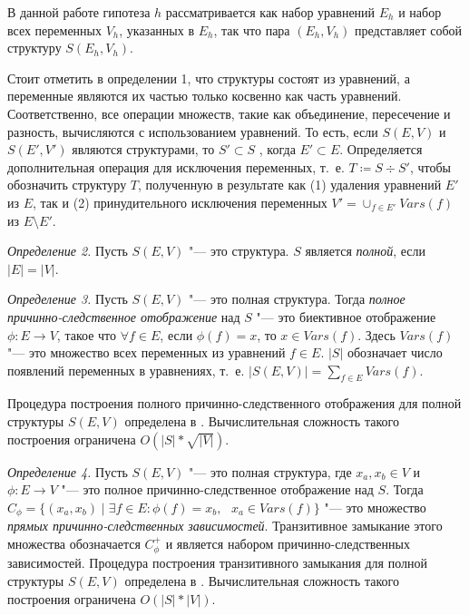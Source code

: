 В данной работе гипотеза $h$ рассматривается как набор уравнений $E_h$ и набор всех переменных $V_h$, указанных 
в $E_h$, так что пара $\left(E_h, V_h\right)$ представляет собой структуру $S\left(E_h, V_h\right)$.

Стоит отметить в определении 1, что структуры состоят из уравнений, а переменные являются их частью только косвенно 
как часть уравнений. Соответственно, все операции множеств, такие как объединение, пересечение и разность, вычисляются 
с использованием уравнений. То есть, если $S(E, V)$ и $S(E',V')$ являются структурами, то $S' \subset S$ , 
когда $E' \subset E$. Определяется дополнительная операция для исключения переменных, т.~е. $T \coloneqq S \div S'$, 
чтобы обозначить структуру $T$, полученную в результате как (1) удаления уравнений $E'$ из $E$, так и 
(2) принудительного исключения переменных $V' = \cup_{f \in E'} Vars(f)$ из $E\setminus	E'$.

\textit{Определение 2.} Пусть $S\left( E, V\right)$ "--- это структура. $S$ является \textit{полной}, если $|E| = |V|$.

\textit{Определение 3.} Пусть $S\left( E, V\right)$ "--- это полная структура. Тогда 
\textit{полное причинно-следственное отображение} над $S$ "--- это биективное отображение $\phi: E\to V$, 
такое что $\forall f \in E$, если $\phi \left( f\right) = x$, то $x \in Vars \left( f \right)$. 
Здесь $Vars \left( f \right)$ "--- это множество всех переменных из уравнений $f \in E$. $|S|$ обозначает число 
появлений переменных в уравнениях, т.~е. $|S\left( E, V\right)| = \sum\limits_{f \in E} Vars\left( f\right)$.


Процедура построения полного причинно-следственного отображения для полной структуры $S\left( E, V\right)$ определена 
в \cite{Goncalves2016}. Вычислительная сложность такого построения ограничена $O\left(|S|*\sqrt{|V|}\right)$.

\textit{Определение 4.} Пусть $S\left( E, V\right)$ "--- это полная структура, где $x_a, x_b \in V$ и $\phi: E \to V$ 
"--- это полное причинно-следственное отображение над $S$. Тогда $C_\phi = \{ \left( x_a, x_b \right) \mid 
\exists f \in E: \phi \left( f \right) = x_b, \text{ } x_a \in Vars\left( f \right) \}$ "--- это множество 
\textit{прямых причинно-следственных зависимостей}. Транзитивное замыкание этого множества обозначается 
$C_\phi^+$ и является набором причинно-следственных зависимостей.  Процедура построения транзитивного замыкания 
для полной структуры $S\left( E, V\right)$ определена в \cite{Goncalves2016}. Вычислительная сложность такого 
построения ограничена $O\left(|S|*|V|\right)$. 

